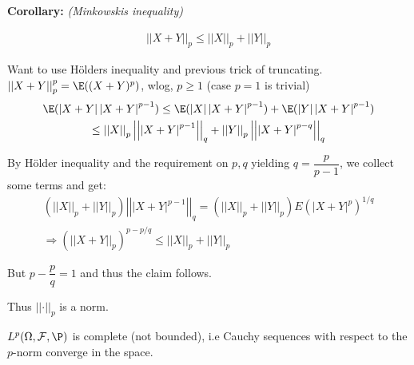 \par\bigskip
\noindent\textbf{Corollary:} \textit{(Minkowskis inequality)}\par
\begin{equation*}
  \begin{gathered}
    \left|\left|X+Y\right|\right|_p\leq \left|\left|X\right|\right|_p+\left|\left|Y\right|\right|_p
  \end{gathered}
\end{equation*}
\par\bigskip
\begin{prf}[]{}
  Want to use Hölders inequality and previous trick of truncating. $\left|\left|X+Y\right|\right|_p^p = \E((X+Y)^p)$, wlog, $p\geq1$ (case $p=1$ is trivial)
  \begin{equation*}
    \begin{gathered}
      \E(\left|X+Y\right|\left|X+Y\right|^{p-1})\leq \E(\left|X\right|\left|X+Y\right|^{p-1})+\E(\left|Y\right|\left|X+Y\right|^{p-1})\\
      \leq \left|\left|X\right|\right|_p\left|\left|\left|X+Y\right|^{p-1}\right|\right|_q+\left|\left|Y\right|\right|_p\left|\left|\left|X+Y\right|^{p-q}\right|\right|_q
    \end{gathered}
  \end{equation*}\par
  \noindent By Hölder inequality and the requirement on $p,q$ yielding $q = \dfrac{p}{p-1}$, we collect some terms and get:
  \begin{equation*}
    \begin{gathered}
      (\left|\left|X\right|\right|_p+\left|\left|Y\right|\right|_p)\left|\left|\left|X+Y\right|^{p-1}\right|\right|_q = (\left|\left|X\right|\right|_p+\left|\left|Y\right|\right|_p)E\left(\left|X+Y\right|^{p}\right)^{1/q}\\
      \Rightarrow(\left|\left|X+Y\right|\right|_p)^{p-p/q}\leq \left|\left|X\right|\right|_p+\left|\left|Y\right|\right|_p
    \end{gathered}
  \end{equation*}\par
  \noindent But $p-\dfrac{p}{q} = 1$ and thus the claim follows.
\end{prf}
\par\bigskip
\noindent Thus $\left|\left|\cdot\right|\right|_p$ is a norm.
\begin{defo}[Completeness of $L^p$]{}
  $L^p(\Omega, \mathcal{F},\P)$ is complete (not bounded), i.e Cauchy sequences with respect to the $p$-norm converge in the space.
\end{defo}
